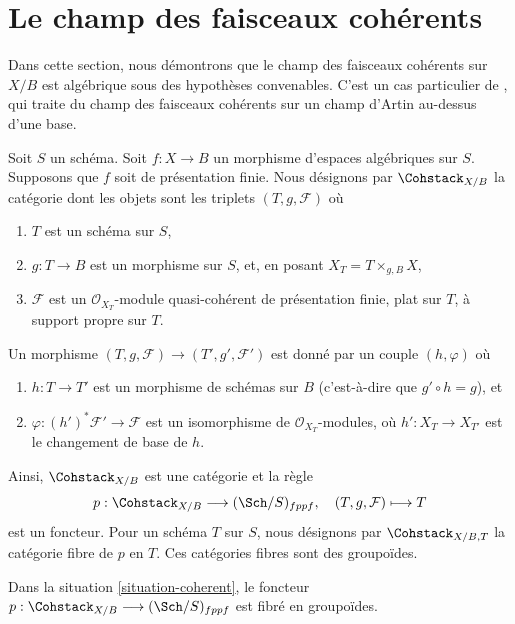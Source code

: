 \section{Le champ des faisceaux cohérents}
\label{section-stack-coherent-sheaves}

\noindent
Dans cette section, nous démontrons que le champ des faisceaux cohérents sur
$X/B$ est algébrique sous des hypothèses convenables. C'est un cas particulier
de \cite[théorème 2.1.1]{lieblich_remarks}, qui traite du champ des faisceaux
cohérents sur un champ d'Artin au-dessus d'une base.

\begin{situation}
\label{situation-coherent}
Soit $S$ un schéma. Soit $f : X \to B$ un morphisme d'espaces algébriques sur
$S$. Supposons que $f$ soit de présentation finie. Nous désignons par
$\Cohstack_{X/B}$ la catégorie dont les objets sont les triplets
$(T, g, \mathcal{F})$ où
\begin{enumerate}
\item $T$ est un schéma sur $S$,
\item $g : T \to B$ est un morphisme sur $S$, et, en posant
$X_T = T \times_{g, B} X$,
\item $\mathcal{F}$ est un $\mathcal{O}_{X_T}$-module quasi-cohérent de
présentation finie, plat sur $T$, à support propre sur $T$.
\end{enumerate}
Un morphisme $(T, g, \mathcal{F}) \to (T', g', \mathcal{F}')$ est donné par
un couple $(h, \varphi)$ où
\begin{enumerate}
\item $h : T \to T'$ est un morphisme de schémas sur $B$
(c'est-à-dire que $g' \circ h = g$), et
\item $\varphi : (h')^*\mathcal{F}' \to \mathcal{F}$ est un isomorphisme de
$\mathcal{O}_{X_T}$-modules, où $h' : X_T \to X_{T'}$ est le changement de
base de $h$.
\end{enumerate}
\end{situation}

\noindent
Ainsi, $\Cohstack_{X/B}$ est une catégorie et la règle
$$
p : \Cohstack_{X/B} \longrightarrow (\Sch/S)_{fppf},
\quad
(T, g, \mathcal{F}) \longmapsto T
$$
est un foncteur. Pour un schéma $T$ sur $S$, nous désignons par
$\Cohstack_{X/B, T}$ la catégorie fibre de $p$ en $T$. Ces catégories fibres
sont des groupoïdes.

\begin{lemma}
\label{lemma-coherent-fibred-in-groupoids}
Dans la situation \ref{situation-coherent}, le foncteur
$p : \Cohstack_{X/B} \longrightarrow (\Sch/S)_{fppf}$ est fibré en
groupoïdes.
\end{lemma}

